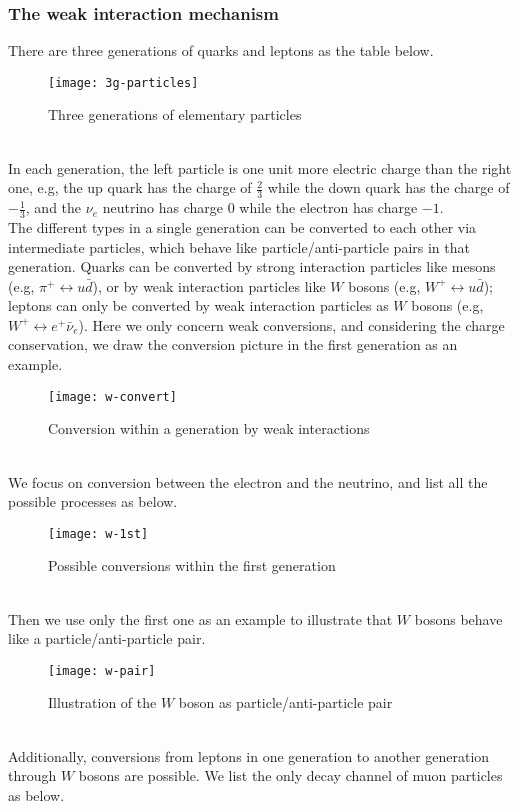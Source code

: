 \documentclass{article}
\renewcommand{\1}{\left}
\renewcommand{\2}{\right}
\newcommand{\n}{\nu}
\begin{document}
\subsubsection{The weak interaction mechanism}
There are three generations of quarks and leptons as the table below.
\begin{figure}[h]
\centering
\texttt{[image: 3g-particles]}
\caption{Three generations of elementary particles}
\end{figure}\\
In each generation, the left particle is one unit more electric charge than the right one, e.g, the up quark has the charge of $\frac2 3$ while the down quark has the charge of $-\frac1 3$, and the $\n_e$ neutrino has charge $0$ while the electron has charge $-1$.\\
The different types in a single generation can be converted to each other via intermediate particles, which behave like particle/anti-particle pairs in that generation. Quarks can be converted by strong interaction particles like mesons (e.g, $\pi^+\leftrightarrow u\bar d$), or by weak interaction particles like $W$ bosons (e.g, $W^+\leftrightarrow u\bar d$); leptons can only be converted by weak interaction particles as $W$ bosons (e.g, $W^+\leftrightarrow e^+\bar \n_e$). Here we only concern weak conversions, and considering the charge conservation, we draw the conversion picture in the first generation as an example.
\begin{figure}[h]
\centering
\texttt{[image: w-convert]}
\caption{Conversion within a generation by weak interactions}
\end{figure}\\
We focus on conversion between the electron and the neutrino, and list all the possible processes as below.
\begin{figure}[h]
\centering
\texttt{[image: w-1st]}
\caption{Possible conversions within the first generation}
\end{figure}\\
Then we use only the first one as an example to illustrate that $W$ bosons behave like a particle/anti-particle pair.
\begin{figure}[h]
\centering
\texttt{[image: w-pair]}
\caption{Illustration of the $W$ boson as particle/anti-particle pair}
\end{figure}\\
Additionally, conversions from leptons in one generation to another generation through $W$ bosons are possible. We list the only decay channel of muon particles as below.
\end{document}
